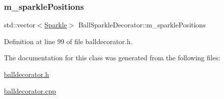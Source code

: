 \mbox{\label{class_ball_sparkle_decorator_a225c9a37159214fbb658148713227fcf}} 
\subsubsection{\texorpdfstring{m\+\_\+sparkle\+Positions}{m\_sparklePositions}}
{\footnotesize\ttfamily std\+::vector$<$\mbox{\hyperlink{struct_ball_sparkle_decorator_1_1_sparkle}{Sparkle}}$>$ Ball\+Sparkle\+Decorator\+::m\+\_\+sparkle\+Positions\hspace{0.3cm}{\ttfamily [protected]}}



Definition at line 99 of file balldecorator.\+h.



The documentation for this class was generated from the following files\+:\begin{DoxyCompactItemize}
\item 
\mbox{\hyperlink{balldecorator_8h}{balldecorator.\+h}}\item 
\mbox{\hyperlink{balldecorator_8cpp}{balldecorator.\+cpp}}\end{DoxyCompactItemize}
